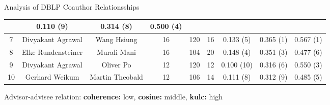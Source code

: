 \begin{frame}{Analysis of DBLP Coauthor Relationsships}
{\begin{tabular}{|c|c|c|c|c|c||c|c|c|}
			                          &
			0.110 (9)                 & 0.314 (8)                     & 0.500 (4)                                                  \\\hline
			\color{red}7              & \color{red}Divyakant Agrawal  &
			\color{red}Wang Hsiung    & \color{red}16                 & \color{red}120       &
			\color{red}16             & \color{red}0.133 (5)          & \color{red}0.365 (1)
			                          & \color{red}0.567 (1)                                                                       \\\hline
			8                         & Elke Rundensteiner            & Murali Mani          & 16               & 104 & 20
			                          &
			0.148 (4)                 & 0.351 (3)                     & 0.477 (6)                                                  \\\hline
			\color{red}9              & \color{red}Divyakant Agrawal  &
			\color{red}Oliver Po      & \color{red}12                 & \color{red}120       &
			\color{red}12             & \color{red}0.100 (10)         & \color{red}0.316
			(6)                       & \color{red}0.550 (3)                                                                       \\\hline
			10                        & Gerhard Weikum                & Martin Theobald      & 12               & 106 & 14
			                          &
			0.111 (8)                 & 0.312 (9)                     & 0.485 (5)                                                  \\\hline
		\end{tabular}}

	\begin{center}
		\centering
		\tiny\color{red}
		Advisor-advisee relation:
		\textbf{coherence:} low,
		\textbf{cosine:} middle,
		\textbf{kulc:} high
	\end{center}
\end{frame}

